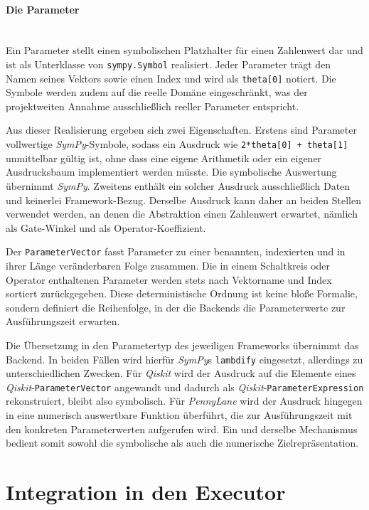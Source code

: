 \paragraph*{Die Parameter}\mbox{}\\
\label{par:parameter}
Ein Parameter stellt einen symbolischen Platzhalter für einen Zahlenwert dar und
ist als Unterklasse von \texttt{sympy.Symbol} realisiert. Jeder Parameter trägt
den Namen seines Vektors sowie einen Index und wird als \texttt{theta[0]}
notiert. Die Symbole werden zudem auf die reelle Domäne eingeschränkt, was der
projektweiten Annahme ausschließlich reeller Parameter entspricht.

Aus dieser Realisierung ergeben sich zwei Eigenschaften. Erstens sind Parameter
vollwertige \textit{SymPy}-Symbole, sodass ein Ausdruck wie \texttt{2*theta[0] +
theta[1]} unmittelbar gültig ist, ohne dass eine eigene Arithmetik oder ein
eigener Ausdrucksbaum implementiert werden müsste. Die symbolische Auswertung
übernimmt \textit{SymPy}. Zweitens enthält ein solcher Ausdruck ausschließlich Daten und
keinerlei Framework-Bezug. Derselbe Ausdruck kann daher an beiden Stellen
verwendet werden, an denen die Abstraktion einen Zahlenwert erwartet, nämlich
als Gate-Winkel und als Operator-Koeffizient.

Der \texttt{ParameterVector} fasst Parameter zu einer benannten, indexierten und
in ihrer Länge veränderbaren Folge zusammen. Die in einem Schaltkreis oder
Operator enthaltenen Parameter werden stets nach Vektorname und Index sortiert
zurückgegeben. Diese deterministische Ordnung ist keine bloße Formalie, sondern
definiert die Reihenfolge, in der die Backends die Parameterwerte zur
Ausführungszeit erwarten.

Die Übersetzung in den Parametertyp des jeweiligen Frameworks übernimmt das
Backend. In beiden Fällen wird hierfür \textit{SymPy}s \texttt{lambdify} eingesetzt,
allerdings zu unterschiedlichen Zwecken. Für \textit{Qiskit} wird der Ausdruck auf die
Elemente eines \textit{Qiskit}-\texttt{ParameterVector} angewandt und dadurch als
\textit{Qiskit}-\texttt{ParameterExpression} rekonstruiert, bleibt also symbolisch. Für
\textit{PennyLane} wird der Ausdruck hingegen in eine numerisch auswertbare Funktion
überführt, die zur Ausführungszeit mit den konkreten Parameterwerten aufgerufen
wird. Ein und derselbe Mechanismus bedient somit sowohl die symbolische als auch
die numerische Zielrepräsentation.

\section{Integration in den Executor}
\label{sec:integration}

